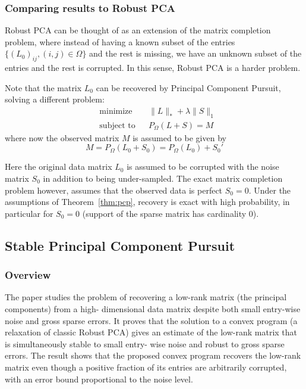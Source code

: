 \documentclass{../common/projectreport}
\begin{document}
\subsubsection{Comparing results to Robust PCA}
Robust PCA can be thought of as an extension of the matrix completion problem, where instead of having a known subset of the entries $\{(L_0)_{ij}, (i,j)\in \Omega\}$ and the rest is missing, we have an unknown subset of the entries and the rest is corrupted. In this sense, Robust PCA is a harder problem.

Note that the matrix $L_0$ can be recovered by Principal Component Pursuit, solving a different problem:
\begin{equation}
\begin{aligned}
&\text{minimize} && \|L\|_* + \lambda \|S\|_1\\
&\text{subject to} && P_\Omega (L+S) = M
\end{aligned}
\end{equation}
where now the observed matrix $M$ is assumed to be given by
\[
M = P_\Omega (L_0 + S_0) = P_\Omega (L_0) + S_0'
\]

Here the original data matrix $L_0$ is assumed to be corrupted with the noise matrix $S_0$ in addition to being under-sampled. The exact matrix completion problem however, assumes that the observed data is perfect $S_0 = 0$. Under the assumptions of Theorem~\ref{thm:pcp}, recovery is exact with high probability, in particular for $S_0 = 0$ (support of the sparse matrix has cardinality $0$).




\subsection{Stable Principal Component Pursuit}
\subsubsection{Overview}

The paper studies the problem of recovering a low-rank matrix (the principal components) from a high- dimensional data matrix despite both small entry-wise noise and gross sparse errors. It proves that the solution to a convex program (a relaxation of classic Robust PCA) gives an estimate of the low-rank matrix that is simultaneously stable to small entry- wise noise and robust to gross sparse errors. The result shows that the proposed convex program recovers the low-rank matrix even though a positive fraction of its entries are arbitrarily corrupted, with an error bound proportional to the noise level.
\end{document}
